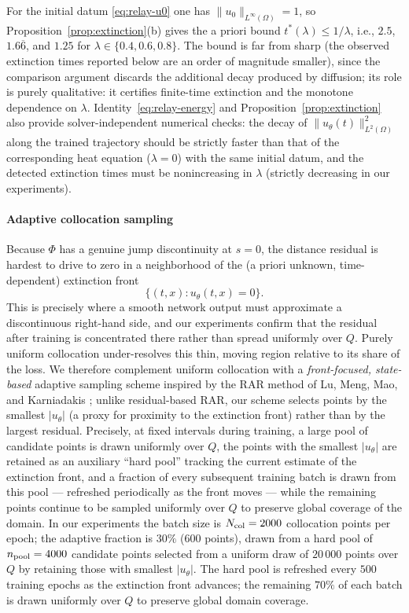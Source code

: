 \documentclass[11pt]{elsarticle}
\theoremstyle{definition}
\theoremstyle{remark}
\numberwithin{equation}{section}
\begin{document}
For the initial datum \eqref{eq:relay-u0} one has
$\|u_0\|_{L^\infty(\Omega)}=1$, so Proposition~\ref{prop:extinction}(b)
gives the a priori bound $t^*(\lambda)\le1/\lambda$, i.e., $2.5$, $1.6\overline{6}$,
and $1.25$ for $\lambda\in\{0.4,0.6,0.8\}$. The bound is far from sharp
(the observed extinction times reported below are an order of magnitude
smaller), since the comparison argument discards the additional decay
produced by diffusion; its role is purely qualitative: it certifies
finite-time extinction and the monotone dependence on $\lambda$.
Identity~\eqref{eq:relay-energy} and
Proposition~\ref{prop:extinction} also provide solver-independent
numerical checks: the decay of $\|u_\theta(t)\|_{L^2(\Omega)}^2$ along the
trained trajectory should be strictly faster than that of the corresponding
heat equation ($\lambda=0$) with the same initial datum, and the detected
extinction times must be nonincreasing in $\lambda$ (strictly decreasing in
our experiments).

\paragraph{Adaptive collocation sampling}
Because $\Phi$ has a genuine jump discontinuity at $s=0$, the distance
residual is hardest to drive to zero in a neighborhood of the (a priori
unknown, time-dependent) extinction front $$\{(t,x):u_\theta(t,x)=0\}.$$ This
is precisely where a smooth network output must approximate a discontinuous
right-hand side, and our experiments confirm that the residual after
training is concentrated there rather than spread uniformly over $Q$.
Purely uniform collocation under-resolves this thin, moving region relative
to its share of the loss. We therefore complement uniform collocation with
a \emph{front-focused, state-based} adaptive sampling scheme inspired by
the RAR method of Lu, Meng, Mao, and Karniadakis
\cite{LuMengMaoKarniadakis2021DeepXDE}; unlike residual-based RAR, our
scheme selects points by the smallest $|u_\theta|$ (a proxy for proximity
to the extinction front) rather than by the largest residual. Precisely, at fixed intervals during training,
a large pool of candidate points is drawn uniformly over $Q$, the points
with the smallest $|u_\theta|$ are retained as an auxiliary ``hard pool''
tracking the current estimate of the extinction front, and a fraction of
every subsequent training batch is drawn from this pool — refreshed
periodically as the front moves — while the remaining points continue to be
sampled uniformly over $Q$ to preserve global coverage of the domain.
In our experiments the batch size is $N_{\rm col}=2000$ collocation points per
epoch; the adaptive fraction is $30\%$ (600 points), drawn from a hard pool
of $n_{\rm pool}=4000$ candidate points selected from a uniform draw of
$20\,000$ points over $Q$ by retaining those with smallest $|u_\theta|$.
The hard pool is refreshed every $500$ training epochs as the extinction
front advances; the remaining $70\%$ of each batch is drawn uniformly over
$Q$ to preserve global domain coverage.
\end{document}
